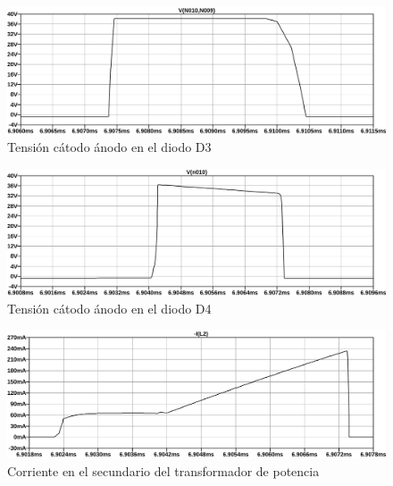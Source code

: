 \begin{figure}[ht]
    \centering
    \includegraphics[width=\textwidth]{images/sim/26.pdf}
    \caption{Tensión cátodo ánodo en el diodo D3}
    \label{fig:sim:26}
\end{figure}

\begin{figure}[ht]
    \centering
    \includegraphics[width=\textwidth]{images/sim/27.pdf}
    \caption{Tensión cátodo ánodo en el diodo D4}
    \label{fig:sim:27}
\end{figure}

\begin{figure}[ht]
    \centering
    \includegraphics[width=\textwidth]{images/sim/28.pdf}
    \caption{Corriente en el secundario del transformador de potencia}
    \label{fig:sim:28}
\end{figure}

